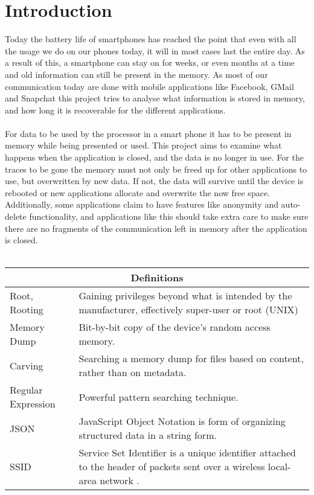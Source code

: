 \section{Introduction}
Today the battery life of smartphones has reached the point that even with all the usage we do on our phones today, it will in most cases last the entire day. As a result of this, a smartphone can stay on for weeks, or even months at a time and old information can still be present in the memory. As most of our communication today are done with mobile applications like Facebook, GMail and Snapchat this project tries to analyse what information is stored in memory, and how long it is recoverable for the different applications. \\ \\
For data to be used by the processor in a smart phone it has to be present in memory while being presented or used. This project aims to examine what happens when the application is closed, and the data is no longer in use. For the traces to be gone the memory must not only be freed up for other applications to use, but overwritten by new data. If not, the data will survive until the device is rebooted or new applications allocate and overwrite the now free space. Additionally, some applications claim to have features like anonymity and auto-delete functionality, and applications like this should take extra care to make sure there are no fragments of the communication left in memory after the application is closed.
\\ \\
\begin{tabular}{ |p{3cm}|p{4cm}|  }
 \hline
 \multicolumn{2}{|c|}{\textbf{Definitions}} \\
 \hline
 Root, Rooting&Gaining privileges beyond what is intended by the manufacturer, effectively super-user or root (UNIX) \\
 \hline
  Memory Dump& Bit-by-bit copy of the device's random access memory.\\
 \hline
 Carving& Searching a memory dump for  files based on content, rather than on metadata.\\
 \hline
 Regular Expression & Powerful pattern searching technique.\\
 \hline
 JSON & JavaScript Object Notation is form of organizing structured data in a string form.\\
 \hline
 SSID & Service Set Identifier is a unique identifier attached to the header of packets sent over a wireless local-area network .\\
 \hline
\end{tabular}

\clearpage